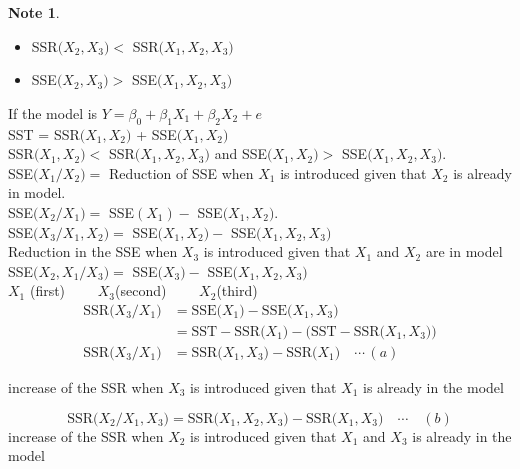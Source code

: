\documentclass[11pt,a4paper]{article}
\theoremstyle{definition}
\newtheorem*{note}{Note}
\begin{document}
\begin{note}
\begin{itemize}
      \item[] SSR$\big(X_2,X_3\big)<$ SSR$\big(X_1,X_2,X_3\big)$
      
      \item[] SSE$\big(X_2,X_3\big) >$ SSE$\big(X_1,X_2,X_3\big)$\\
\end{itemize}


If the model is $Y=\beta_0+\beta_1X_1+\beta_2X_2+e$\\

SST = SSR$\big(X_1,X_2\big)$ + SSE$\big(X_1,X_2\big)$\\

SSR$\big(X_1,X_2\big)<$ SSR$\big(X_1,X_2,X_3\big)$ and SSE$\big(X_1,X_2\big)>$ SSE$\big(X_1,X_2,X_3\big)$.\\


SSE$\big(X_1/X_2\big)=$ Reduction of SSE when $X_1$ is introduced given that $X_2$ is already in model.\\

SSE$\big(X_2/X_1\big)=$ SSE$(X_1)-$ SSE$\big(X_1,X_2\big)$.\\

SSE$\big(X_3/X_1,X_2\big)=$ SSE$\big(X_1,X_2\big)-$ SSE$\big(X_1,X_2,X_3\big)$\\

Reduction in the SSE when $X_3$ is introduced given that $X_1$ and $X_2$ are in model\\

SSE$\big(X_2,X_1/X_3)=$ SSE$\big(X_3\big)-$ SSE$\big(X_1,X_2,X_3\big)$\\

$X_1$ (first) $\qquad  X_3$(second) $\qquad  X_2$(third)\\

\begin{align*}
\text{SSR}\big(X_3/X_1\big) & = \text{SSE}\big(X_1\big)-\text{SSE}\big(X_1,X_3\big)\\
                            & = \text{SST}-\text{SSR}\big(X_1\big)-\Big(\text{SST}-\text{SSR}\big(X_1,X_3\big)\Big)\\
\text{SSR}\big(X_3/X_1\big) & = \text{SSR}\big(X_1,X_3\big)-\text{SSR}\big(X_1\big)\quad \cdots \, (a)
\end{align*}

increase of the SSR when $X_3$ is introduced given that $X_1$ is already in the model

$$\text{SSR}\big(X_2/X_1,X_3\big)=\text{SSR}\big(X_1,X_2,X_3\big)-\text{SSR}\big(X_1,X_3\big)\quad \cdots \quad  (b)$$
increase of the SSR when $X_2$ is introduced given that $X_1$ and $X_3$ is already in the model



\end{note}
\end{document}

